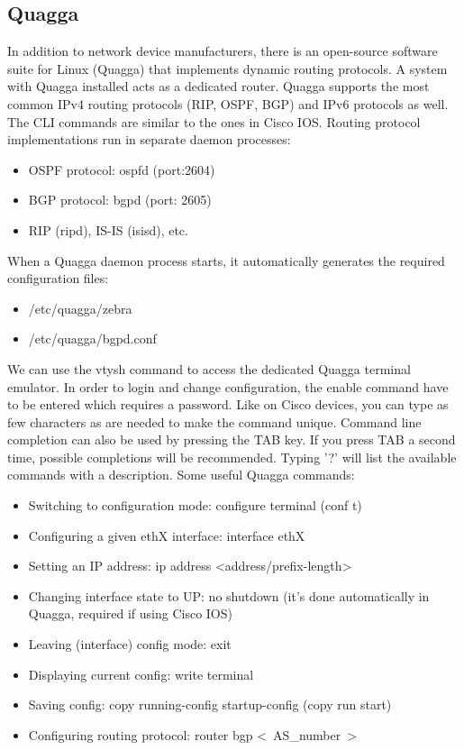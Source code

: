 \documentclass[a4paper]{article}
\begin{document}
\subsection{Quagga}
In addition to network device manufacturers, there is an open-source software suite for Linux (Quagga) that implements
dynamic routing protocols. A system with Quagga installed acts as a dedicated router. Quagga supports the most common
IPv4 routing protocols (RIP, OSPF, BGP) and IPv6 protocols as well. The CLI commands are similar to the ones in Cisco
IOS. Routing protocol implementations run in separate daemon processes:
\begin{itemize}
    \item OSPF protocol: ospfd (port:2604)
    \item BGP protocol: bgpd (port: 2605)
    \item RIP (ripd), IS-IS (isisd), etc.
\end{itemize}

When a Quagga daemon process starts, it automatically generates the required configuration files:

\begin{itemize}
    \item /etc/quagga/zebra
    \item /etc/quagga/bgpd.conf
\end{itemize}

We can use the vtysh command to access the dedicated Quagga terminal emulator. In order to login and change
configuration, the enable command have to be entered which requires a password. Like on Cisco devices, you can type as
few characters as are needed to make the command unique. Command line completion can also be used by pressing the TAB
key. If you press TAB a second time, possible completions will be recommended. Typing '?' will list the available
commands with a description.
Some useful Quagga commands:

\begin{itemize}
    \item Switching to configuration mode: configure terminal (conf t)
    \item Configuring a given ethX interface: interface ethX
    \item Setting an IP address: ip address <address/prefix-length>
    \item Changing interface state to UP: no shutdown (it's done automatically in Quagga, required if using Cisco IOS)
    \item Leaving (interface) config mode: exit
    \item Displaying current config: write terminal
    \item Saving config: copy running-config startup-config (copy run start)
    \item Configuring routing protocol: router bgp \textless~AS\_number~\textgreater
\end{itemize}
\end{document}
